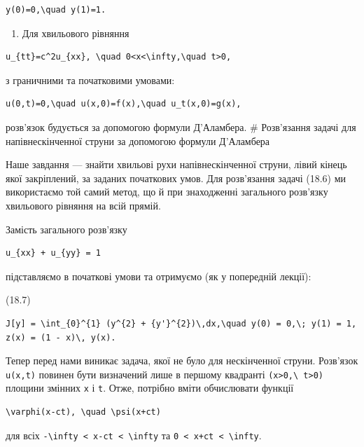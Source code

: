 \documentclass[
  ukrainian,
]{article}
\providecommand{\tightlist}{%
  \setlength{\itemsep}{0pt}\setlength{\parskip}{0pt}}
\begin{document}
\begin{verbatim}
y(0)=0,\quad y(1)=1.
\end{verbatim}

\begin{enumerate}
\def\labelenumi{\arabic{enumi}.}
\setcounter{enumi}{1}
\tightlist
\item
  Для хвильового рівняння
\end{enumerate}

\begin{verbatim}
u_{tt}=c^2u_{xx}, \quad 0<x<\infty,\quad t>0,
\end{verbatim}

з граничними та початковими умовами:

\begin{verbatim}
u(0,t)=0,\quad u(x,0)=f(x),\quad u_t(x,0)=g(x),
\end{verbatim}

розв'язок будується за допомогою формули Д'Аламбера. \# Розв'язання
задачі для напівнескінченної струни за допомогою формули Д'Аламбера

Наше завдання --- знайти хвильові рухи напівнескінченної струни, лівий
кінець якої закріплений, за заданих початкових умов. Для розв'язання
задачі (18.6) ми використаємо той самий метод, що й при знаходженні
загального розв'язку хвильового рівняння на всій прямій.

Замість загального розв'язку

\begin{verbatim}
u_{xx} + u_{yy} = 1
\end{verbatim}

підставляємо в початкові умови та отримуємо (як у попередній лекції):

(18.7)

\begin{verbatim}
J[y] = \int_{0}^{1} (y^{2} + {y'}^{2})\,dx,\quad y(0) = 0,\; y(1) = 1,
z(x) = (1 - x)\, y(x).
\end{verbatim}

Тепер перед нами виникає задача, якої не було для нескінченної струни.
Розв'язок \texttt{u(x,t)} повинен бути визначений лише в першому
квадранті \texttt{(x\textgreater{}0,\textbackslash{}\ t\textgreater{}0)}
площини змінних \texttt{x} і \texttt{t}. Отже, потрібно вміти
обчислювати функції

\begin{verbatim}
\varphi(x-ct), \quad \psi(x+ct)
\end{verbatim}

для всіх
\texttt{-\textbackslash{}infty\ \textless{}\ x-ct\ \textless{}\ \textbackslash{}infty}
та \texttt{0\ \textless{}\ x+ct\ \textless{}\ \textbackslash{}infty}.
\end{document}
